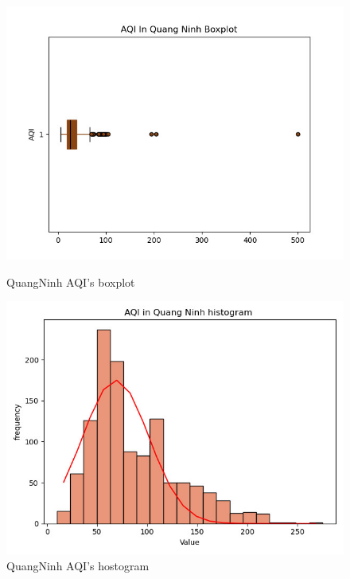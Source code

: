\documentclass[conference]{IEEEtran}
\begin{document}
\begin{figure}[H]
    \centering
    \begin{minipage}{0.23\textwidth}
        \centering
        \includegraphics[width=1\textwidth]{bibliography/figure/Analysis-Dataset/qn_box.png}
        \caption{QuangNinh AQI's boxplot}
        \label{fig:1}
    \end{minipage}
    \hfill
    \begin{minipage}{0.23\textwidth}
        \centering
        \includegraphics[width=1\textwidth]{bibliography/figure/Analysis-Dataset/qn_his.png}
        \caption{QuangNinh AQI's hostogram}
        \label{fig:2}
    \end{minipage}
\end{figure}
\end{document}
